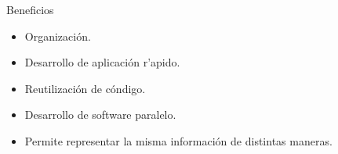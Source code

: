 \begin{frame}{Beneficios}
	\begin{itemize}
		\item Organizaci\'on.
		\item Desarrollo de aplicaci\'on r'apido.
		\item Reutilizaci\'on de c\'ondigo.
		\item Desarrollo de software paralelo.
		\item Permite representar la misma informaci\'on de distintas maneras.

	\end{itemize}
\end{frame}





%
